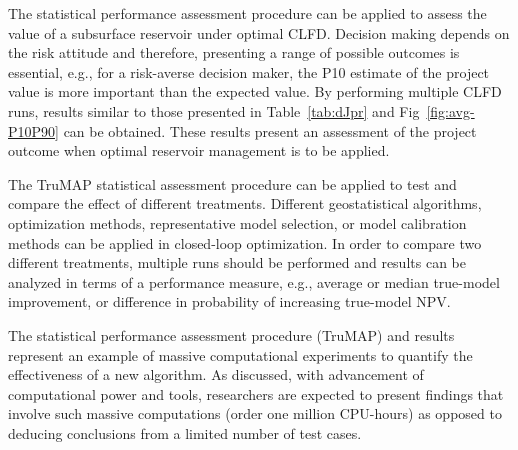 \documentclass[11pt]{article}
\begin{document}
The statistical performance assessment procedure can be applied to assess the value of a subsurface reservoir
under optimal CLFD.
Decision making depends on the risk attitude and therefore, presenting a range
of possible outcomes is essential, e.g., for a risk-averse decision maker, the P10 estimate of the project value is more important
than the expected value.
By performing multiple CLFD runs, results similar to those presented in Table~\ref{tab:dJpr}
and Fig~\ref{fig:avg-P10P90} can be obtained.
These results present an assessment of
the project outcome when optimal reservoir management is to be applied.


The TruMAP statistical assessment procedure can be applied to test and compare the effect of different treatments.
Different geostatistical algorithms, optimization methods, representative model selection,
or model calibration methods can be applied in closed-loop optimization.
In order to compare two different treatments, multiple runs should be performed
and results can be analyzed in terms of a performance measure, e.g., average or median true-model improvement,
or difference in probability of increasing true-model NPV.

The statistical performance assessment procedure (TruMAP) and results represent an example of
massive computational experiments to quantify the effectiveness of a new algorithm. As \citet{monajemi:16} discussed,
with advancement of computational power and tools,
researchers are expected to present findings that involve such massive computations (order one million CPU-hours) as opposed to deducing conclusions
from a limited number of test cases.
\end{document}
